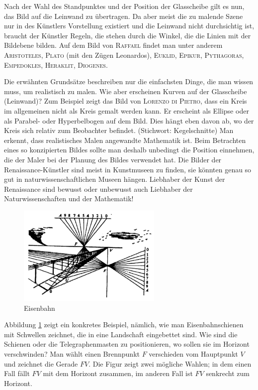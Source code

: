 \documentclass[%
11pt,%
twoside,%
titlepage,%
german,%
headsepline%
]{scrartcl}
\begin{document}
Nach der Wahl des Standpunktes und der Position der Glasscheibe gilt es nun, das Bild auf die Leinwand zu \"ubertragen. Da aber meist die zu malende Szene nur in des K\"unstlers Vorstellung existiert und die Leinwand nicht durchsichtig ist, braucht der K\"unstler Regeln, die stehen durch die Winkel, die die Linien mit der Bildebene bilden. Auf dem Bild von \textsc{Raffael} findet man unter anderem \textsc{Aristoteles, Plato} (mit den Z\"ugen Leonardos), \textsc{Euklid, Epikur, Pythagoras, Empedokles, Heraklit, Diogenes}.

Die erw\"ahnten Grunds\"atze beschreiben nur die einfachsten Dinge, die man wissen muss, um realistisch zu malen. Wie aber erscheinen Kurven auf der Glasscheibe (Leinwand)?
Zum Beispiel zeigt das Bild von \textsc{Lorenzo di Pietro}, dass ein Kreis im allgemeinen nicht als Kreis gemalt werden kann. Er erscheint als Ellipse oder als Parabel- oder Hyperbelbogen auf dem Bild. Dies h\"angt eben davon ab, wo der Kreis sich relativ zum Beobachter befindet. (Stichwort: Kegelschnitte)
Man erkennt, dass realistisches Malen angewandte Mathematik ist. Beim Betrachten eines so konzipierten Bildes sollte man deshalb unbedingt die Position einnehmen, die der Maler bei der Planung des Bildes verwendet hat. Die Bilder der Renaissance-K\"unstler sind meist in Kunstmuseen zu finden, sie k\"onnten genau so gut in naturwissenschaftlichen Museen h\"angen. Liebhaber der Kunst der Renaissance sind bewusst oder unbewusst auch Liebhaber der Naturwissenschaften und der Mathematik!

\begin{figure}[h!]
\begin{center}
\includegraphics[width=0.618\textwidth]{pictures/eisenbahn}
\end{center}
\caption{Eisenbahn}\label{eisenbahn}
\end{figure}

Abbildung \ref{eisenbahn} zeigt ein konkretes Beispiel, n\"amlich, wie man Eisenbahnschienen mit Schwellen zeichnet, die in eine Landschaft eingebettet sind. Wie sind die Schienen oder die Telegraphenmasten zu positionieren, wo sollen sie im Horizont verschwinden? Man w\"ahlt einen Brennpunkt $F$ verschieden vom Hauptpunkt $V$ und zeichnet die Gerade $FV$. Die Figur zeigt zwei m\"ogliche Wahlen; in dem einen Fall f\"allt $FV$ mit dem Horizont zusammen, im anderen Fall ist $FV$ senkrecht zum Horizont.
\end{document}
